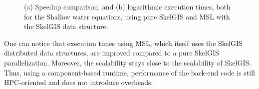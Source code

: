 \begin{figure}
\begin{center}
\hspace{10pt}
\end{center}
\caption{(a) Speedup comparison, and (b) logarithmic execution times, both for the Shallow water equations, using pure SkelGIS and MSL with the SkelGIS data structure.}
\label{fig:perfs}
\end{figure}

One can notice that execution times using MSL, which itself uses the SkelGIS distributed data structures, are improved compared to a pure SkelGIS parallelization. Moreover, the scalability stays close to the scalability of SkelGIS. Thus, using a component-based runtime, performance of the back-end code is still HPC-oriented and does not introduce overheads.

